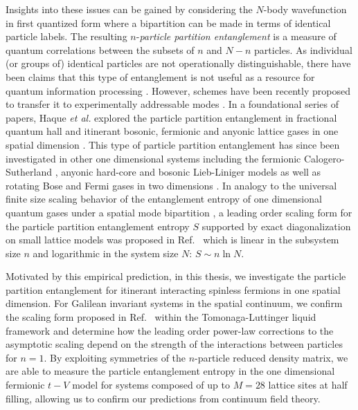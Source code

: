 Insights into these issues can be gained by considering the $N$-body
wavefunction in first quantized form  where a bipartition can be made in terms
of identical particle labels.  The resulting $n$-\emph{particle partition
entanglement} is a measure of quantum correlations between the subsets of $n$
and $N-n$ particles.  As individual (or groups of) identical
particles are not operationally distinguishable, there have been claims that
this type of entanglement is not useful as a resource for quantum information
processing \cite{Ghirardi:2004dl,Tichy:2011je,Balachandran:2013en}.  However,
schemes have been recently proposed to transfer it to experimentally
addressable modes \cite{Killoran:2014gu}.  In a foundational series of papers,
Haque \emph{et al.} explored the particle partition entanglement
in fractional quantum hall \cite{Zozulya:2007jw,Haque:2007il} and itinerant
bosonic, fermionic and anyonic lattice gases in one spatial dimension
\cite{Zozulya:2008kb,Haque:2009df}.  This type of particle partition
entanglement has since been investigated in other one dimensional systems
including the fermionic Calogero-Sutherland \cite{Katsura:2007hc}, anyonic
hard-core \cite{Santachiara:2007il} and bosonic Lieb-Liniger 
\cite{Herdman:2014jq, Herdman:2015gx} models
as well as rotating Bose and Fermi gases in two dimensions
\cite{Liu:2010pe}.  In analogy to the universal finite size scaling behavior of
the entanglement entropy of one dimensional quantum gases under a spatial
mode bipartition \cite{Calabrese:2004hl, Calabrese:2011fj,
Calabrese:2011ji}, a leading order scaling form for the particle partition
entanglement entropy $S$ supported by exact diagonalization on small lattice
models was proposed in Ref.~\cite{Zozulya:2008kb}  which is linear in the
subsystem size $n$ and logarithmic in the system size $N$: $S \sim n \ln N$.

Motivated by this empirical prediction, in this thesis, we investigate the particle
partition entanglement for itinerant interacting spinless fermions in one
spatial dimension.  For Galilean invariant systems in the spatial continuum, we
confirm the scaling form proposed in Ref.~\cite{Zozulya:2008kb} within the
Tomonaga-Luttinger liquid framework \cite{Tomonaga1951, Haldane1981}
and determine how the leading order power-law corrections to the asymptotic
scaling depend on the strength of the interactions between particles for $n=1$.
By exploiting symmetries of the $n$-particle reduced density matrix, we are
able to measure the particle entanglement entropy in the one dimensional
fermionic $t-V$ model for systems composed of up to $M=28$ lattice sites at
half filling, allowing us to confirm our predictions from continuum field
theory. 

